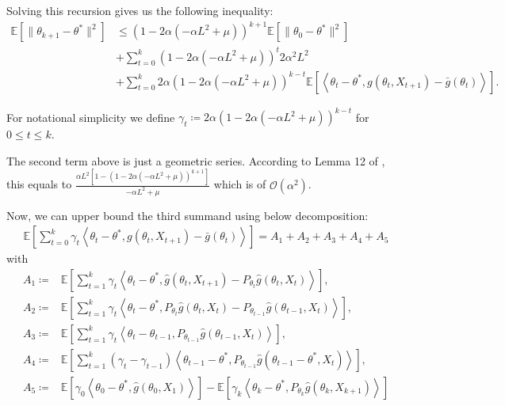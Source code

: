 \documentclass[a4paper]{article}
\newcommand{\norm}[1]{\|#1 \|}
\newcommand{\Exs}{\mathbb{E}}
\newcommand{\thetastar}{\theta^*}
\newcommand{\stepsize}{\alpha}
\begin{document}
	Solving this recursion gives us the following inequality:
	\begin{align*}
		\Exs\left[\norm{\theta_{k + 1} - \thetastar}^{2}\right] & \le \left(1 - 2\stepsize\left(-\stepsize L^{2} + \mu\right)\right)^{k + 1}\Exs\left[\norm{\theta_{0} - \thetastar}^{2}\right] \\
		& + \sum_{t = 0}^{k}\left(1 - 2\stepsize\left(-\stepsize L^{2} + \mu\right)\right)^{t}2\stepsize^{2}L^{2} \\
		& + \sum_{t = 0}^{k}2\stepsize\left(1 - 2\stepsize\left(-\stepsize L^{2} + \mu\right)\right)^{k - t}\Exs\left[\left\langle \theta_{t} - \thetastar, g\left(\theta_{t}, X_{t + 1}\right) - \bar{g}\left(\theta_{t}\right) \right\rangle\right].
	\end{align*}
	
	For notational simplicity we define $\gamma_{t} \coloneq 2\stepsize\left(1 - 2\stepsize\left(-\stepsize L^{2} + \mu\right)\right)^{k - t}$ for $0 \le t \le k$.
	
	The second term above is just a geometric series. According to Lemma 12 of \cite{kaledin2020finite}, this equals to $\frac{\stepsize L^{2}\left[1 - \left(1 - 2\stepsize\left(-\stepsize L^{2} + \mu\right)\right)^{k + 1}\right]}{-\stepsize L^{2} + \mu}$ which is of $\mathcal{O}\left(\stepsize^{2}\right)$.
	
	Now, we can upper bound the third summand using below decomposition:
	\begin{align*}
		\Exs\left[ \sum_{t = 0}^{k} \gamma_{t}\left\langle \theta_{t} - \thetastar, g(\theta_{t}, X_{t + 1}) - \bar{g}(\theta_{t}) \right\rangle \right] = A_{1} + A_{2} + A_{3} + A_{4} + A_{5}
	\end{align*}
	with
	\begin{align*}
		A_{1} \coloneq & \Exs\left[\sum_{t = 1}^{k}\gamma_{t}\left\langle \theta_{t} - \thetastar, \hat{g}\left(\theta_{t}, X_{t + 1}\right) - P_{\theta_{t}}\hat{g}\left(\theta_{t}, X_{t}\right) \right\rangle\right],\\
		A_{2} \coloneq & \Exs\left[\sum_{t = 1}^{k}\gamma_{t}\left\langle \theta_{t} - \thetastar, P_{\theta_{t}}\hat{g}\left(\theta_{t}, X_{t}\right) - P_{\theta_{t - 1}}\hat{g}\left( \theta_{t - 1}, X_{t} \right) \right\rangle\right],\\
		A_{3} \coloneq & \Exs\left[\sum_{t = 1}^{k}\gamma_{t}\left\langle \theta_{t} - \theta_{t - 1}, P_{\theta_{t - 1}}\hat{g}\left( \theta_{t - 1}, X_{t}\right) \right\rangle\right],\\
		A_{4} \coloneq & \Exs\left[\sum_{t = 1}^{k}\left(\gamma_{t} - \gamma_{t - 1}\right)\left\langle \theta_{t - 1} - \thetastar, P_{\theta_{t - 1}}\hat{g}\left( \theta_{t - 1} - \thetastar, X_{t}\right) \right\rangle\right],\\
		A_{5} \coloneq & \Exs\left[\gamma_{0}\left\langle \theta_{0} - \thetastar, \hat{g}\left(\theta_{0}, X_{1}\right) \right\rangle\right] - \Exs\left[\gamma_{k}\left\langle \theta_{k} - \thetastar, P_{\theta_{k}}\hat{g}\left(\theta_{k}, X_{k + 1}\right)\right\rangle\right]
	\end{align*}
	
\end{document}
